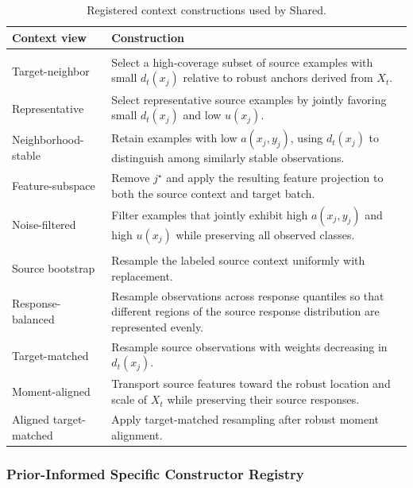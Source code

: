 \begin{table}[H]
  \caption{Registered context constructions used by Shared.}
  \label{tab:shared-context-bank}
  \centering
  \footnotesize
  \begin{tabular}{@{}>{\raggedright\arraybackslash}p{} >{\raggedright\arraybackslash}p{}@{}}
    \toprule
    Context view & Construction \\
    \midrule
    \multicolumn{2}{@{}l}{\textit{Classification}} \\
    Target-neighbor
      & Select a high-coverage subset of source examples with small
        $d_t(x_j)$ relative to robust anchors derived from $X_t$. \\
    Representative
      & Select representative source examples by jointly favoring small
        $d_t(x_j)$ and low $u(x_j)$. \\
    Neighborhood-stable
      & Retain examples with low $a(x_j,y_j)$, using $d_t(x_j)$ to distinguish
        among similarly stable observations. \\
    Feature-subspace
      & Remove $j^\star$ and apply the resulting feature projection to both
        the source context and target batch. \\
    Noise-filtered
      & Filter examples that jointly exhibit high $a(x_j,y_j)$ and high
        $u(x_j)$ while preserving all observed classes. \\
    \addlinespace
    \multicolumn{2}{@{}l}{\textit{Regression}} \\
    Source bootstrap
      & Resample the labeled source context uniformly with replacement. \\
    Response-balanced
      & Resample observations across response quantiles so that different
        regions of the source response distribution are represented evenly. \\
    Target-matched
      & Resample source observations with weights decreasing in $d_t(x_j)$. \\
    Moment-aligned
      & Transport source features toward the robust location and scale of
        $X_t$ while preserving their source responses. \\
    Aligned target-matched
      & Apply target-matched resampling after robust moment alignment. \\
    \bottomrule
  \end{tabular}
\end{table}

\subsubsection{Prior-Informed Specific Constructor Registry}

